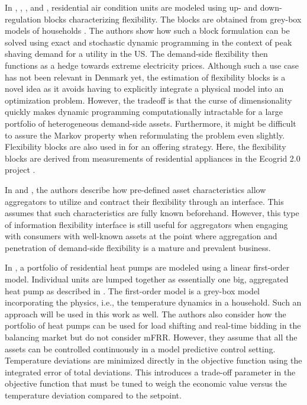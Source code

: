 In \cite{schaperow2019simulation}, \cite{chanpiwat2020using}, \cite{moglen2020optimal}, and \cite{moglen2020optimal}, residential air condition units are modeled using up- and down-regulation blocks characterizing flexibility. The blocks are obtained from grey-box models of households \cite{siemann2013performance}. The authors show how such a block formulation can be solved using exact and stochastic dynamic programming in the context of peak shaving demand for a utility in the US. The demand-side flexibility then functions as a hedge towards extreme electricity prices. Although such a use case has not been relevant in Denmark yet, the estimation of flexibility blocks is a novel idea as it avoids having to explicitly integrate a physical model into an optimization problem. However, the tradeoff is that the curse of dimensionality quickly makes dynamic programming computationally intractable for a large portfolio of heterogeneous demand-side assets. Furthermore, it might be difficult to assure the Markov property \cite{MarkovProperty} when reformulating the problem even slightly. Flexibility blocks are also used in \cite{bobo2018offering} for an offering strategy. Here, the flexibility blocks are derived from measurements of residential appliances in the Ecogrid 2.0 project \cite{ecogrid}.

In \cite{biegel2013information} and \cite{BiegelConstractingFlexServices}, the authors describe how pre-defined asset characteristics allow aggregators to utilize and contract their flexibility through an interface. This assumes that such characteristics are fully known beforehand. However, this type of information flexibility interface is still useful for aggregators when engaging with consumers with well-known assets at the point where aggregation and penetration of demand-side flexibility is a mature and prevalent business.

In \cite{biegel2013electricity}, a portfolio of residential heat pumps are modeled using a linear first-order model. Individual units are lumped together as essentially one big, aggregated heat pump as described in \cite{biegel2013lumped}. The first-order model is a grey-box model incorporating the physics, i.e., the temperature dynamics in a household. Such an approach will be used in this work as well. The authors also consider how the portfolio of heat pumps can be used for load shifting and real-time bidding in the balancing market but do not consider mFRR. However, they assume that all the assets can be controlled continuously in a  model predictive control  setting. Temperature deviations are minimized directly in the objective function using the integrated error of total deviations. This introduces a trade-off parameter in the objective function that must be tuned to weigh the economic value versus the temperature deviation compared to the setpoint.

